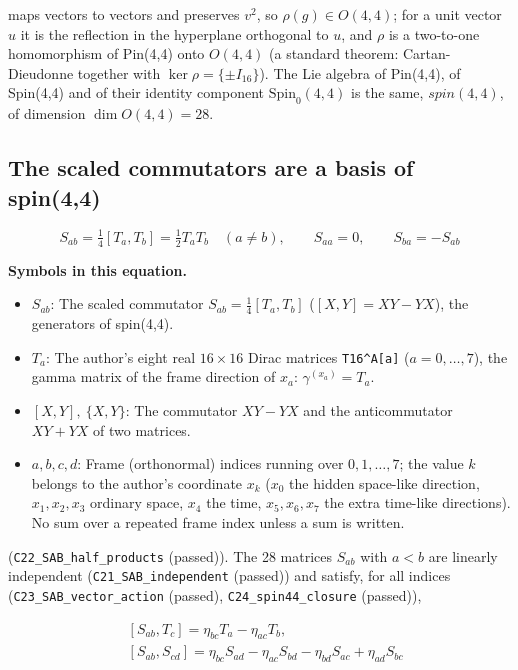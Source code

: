 \documentclass[
  10pt,
]{article}
\providecommand{\tightlist}{%
  \setlength{\itemsep}{0pt}\setlength{\parskip}{0pt}}
\begin{document}
maps vectors to vectors and preserves \(v^2\), so
\(\rho(g) \in O(4,4)\); for a unit vector \(u\) it is the reflection in
the hyperplane orthogonal to \(u\), and \(\rho\) is a two-to-one
homomorphism of Pin(4,4) onto \(O(4,4)\) (a standard theorem:
Cartan-Dieudonne together with \(\ker\rho = \{\pm I_{16}\}\)). The Lie
algebra of Pin(4,4), of Spin(4,4) and of their identity component
\(\mathrm{Spin}_0(4,4)\) is the same, \(spin(4,4)\), of dimension
\(\dim O(4,4) = 28\).

\hypertarget{the-scaled-commutators-are-a-basis-of-spin44}{%
\subsection{The scaled commutators are a basis of
spin(4,4)}\label{the-scaled-commutators-are-a-basis-of-spin44}}

\[
S_{ab} = \tfrac14[T_a, T_b] = \tfrac12T_aT_b\quad (a \ne b),\qquad S_{aa} = 0,\qquad S_{ba} = -S_{ab}
\]

\textbf{Symbols in this equation.}

\begin{itemize}
\tightlist
\item
  \(S_{ab}\): The scaled commutator \(S_{ab} = \tfrac14[T_a, T_b]\)
  (\([X, Y] = XY - YX\)), the generators of spin(4,4).
\item
  \(T_a\): The author's eight real \(16 \times 16\) Dirac matrices
  \texttt{T16\^{}A{[}a{]}} (\(a = 0, \dots, 7\)), the gamma matrix of
  the frame direction of \(x_a\): \(\gamma^{(x_a)} = T_a\).
\item
  \([X, Y],\ \{X, Y\}\): The commutator \(XY - YX\) and the
  anticommutator \(XY + YX\) of two matrices.
\item
  \(a, b, c, d\): Frame (orthonormal) indices running over
  \(0, 1, \dots, 7\); the value \(k\) belongs to the author's coordinate
  \(x_k\) (\(x_0\) the hidden space-like direction, \(x_1, x_2, x_3\)
  ordinary space, \(x_4\) the time, \(x_5, x_6, x_7\) the extra
  time-like directions). No sum over a repeated frame index unless a sum
  is written.
\end{itemize}

(\texttt{C22\_SAB\_half\_products} (passed)). The 28 matrices \(S_{ab}\)
with \(a < b\) are linearly independent (\texttt{C21\_SAB\_independent}
(passed)) and satisfy, for all indices
(\texttt{C23\_SAB\_vector\_action} (passed),
\texttt{C24\_spin44\_closure} (passed)),

\[
\begin{aligned}
&[S_{ab}, T_c] = \eta_{bc}T_a - \eta_{ac}T_b,\\
&[S_{ab}, S_{cd}] = \eta_{bc}S_{ad} - \eta_{ac}S_{bd} - \eta_{bd}S_{ac} + \eta_{ad}S_{bc}
\end{aligned}
\]
\end{document}
